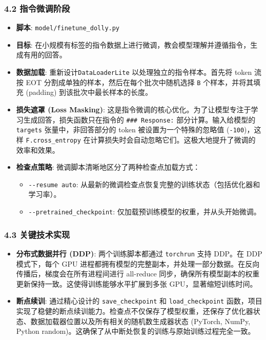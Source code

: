 \documentclass[a4paper]{article}
\providecommand{\tightlist}{%
  \setlength{\itemsep}{0pt}\setlength{\parskip}{0pt}}
\begin{document}
\subsubsection{4.2
指令微调阶段}\label{ux6307ux4ee4ux5faeux8c03ux9636ux6bb5}

\begin{itemize}
\tightlist
\item
  \textbf{脚本}: \texttt{model/finetune\_dolly.py}
\item
  \textbf{目标}:
  在小规模有标签的指令数据上进行微调，教会模型理解并遵循指令，生成有用的回答。
\item
  \textbf{数据加载}: 重新设计\texttt{DataLoaderLite}
  以处理独立的指令样本。首先将 token 流按 EOT
  分割成单独的样本，然后在每个批次中随机选择 \texttt{B}
  个样本，并将其填充 (padding) 到该批次中最长样本的长度。
\item
  \textbf{损失遮罩 (Loss Masking)}:
  这是指令微调的核心优化。为了让模型专注于学习生成回答，损失函数只在指令的
  \texttt{\#\#\#\ Response:} 部分计算。输入给模型的 \texttt{targets}
  张量中，非回答部分的 token 被设置为一个特殊的忽略值
  (\texttt{-100})，这样 \texttt{F.cross\_entropy}
  在计算损失时会自动忽略它们。这极大地提升了微调的效率和效果。
\item
  \textbf{检查点策略}: 微调脚本清晰地区分了两种检查点加载方式：

  \begin{itemize}
  \tightlist
  \item
    \texttt{-\/-resume\ \textquotesingle{}auto\textquotesingle{}}:
    从最新的微调检查点恢复完整的训练状态（包括优化器和学习率）。
  \item
    \texttt{-\/-pretrained\_checkpoint}:
    仅加载预训练模型的权重，并从头开始微调。
  \end{itemize}
\end{itemize}

\subsubsection{4.3
关键技术实现}\label{ux5173ux952eux6280ux672fux5b9eux73b0}

\begin{itemize}
\tightlist
\item
  \textbf{分布式数据并行 (DDP)}: 两个训练脚本都通过 \texttt{torchrun}
  支持 DDP。在 DDP 模式下，每个 GPU
  进程都拥有模型的完整副本，并处理一部分数据。在反向传播后，梯度会在所有进程间进行
  all-reduce
  同步，确保所有模型副本的权重更新保持一致。这使得训练能够水平扩展到多张
  GPU，显著缩短训练时间。
\item
  \textbf{断点续训}: 通过精心设计的 \texttt{save\_checkpoint} 和
  \texttt{load\_checkpoint}
  函数，项目实现了稳健的断点续训能力。检查点不仅保存了模型权重，还保存了优化器状态、数据加载器位置以及所有相关的随机数生成器状态
  (PyTorch, NumPy, Python
  random)。这确保了从中断处恢复的训练与原始训练过程完全一致。
\end{itemize}
\end{document}
